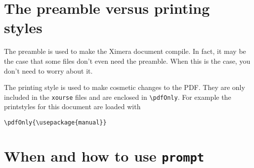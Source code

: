 \documentclass{ximera}
\begin{document}
\section{The preamble versus printing styles}

The preamble is used to make the Ximera document compile. In fact, it may be
the case that some files don't even need the preamble. When this is the case,
you don't need to worry about it.

The printing style is used to make cosmetic changes to the PDF. They are only
included in the \verb!xourse! files and are enclosed in \verb!\pdfOnly!. For
example the printstyles for this document are loaded with
\begin{verbatim}
\pdfOnly{\usepackage{manual}}
\end{verbatim}

\section{When and how to use \texttt{prompt}}
\end{document}

